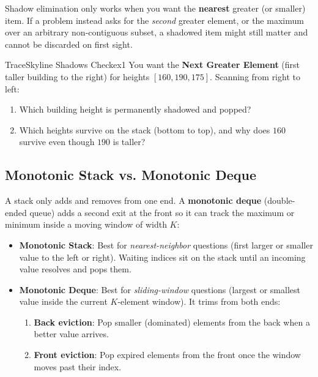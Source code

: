 \documentclass[11pt,a4paper]{article}
\theoremstyle{definition}
\begin{document}
\begin{watchoutbox}
Shadow elimination only works when you want the \textbf{nearest} greater (or smaller) item. If a problem instead asks for the \emph{second} greater element, or the maximum over an arbitrary non-contiguous subset, a shadowed item might still matter and cannot be discarded on first sight.
\end{watchoutbox}

\begin{tryitbox}{Trace}{Skyline Shadows Check}{ex1}
You want the \textbf{Next Greater Element} (first taller building to the right) for heights $[160, 190, 175]$. Scanning from right to left:
\begin{enumerate}
    \item Which building height is permanently shadowed and popped?
    \item Which heights survive on the stack (bottom to top), and why does $160$ survive even though $190$ is taller?
\end{enumerate}
\end{tryitbox}

\subsection{Monotonic Stack vs. Monotonic Deque}

A stack only adds and removes from one end. A \textbf{monotonic deque} (double-ended queue) adds a second exit at the front so it can track the maximum or minimum inside a moving window of width $K$:

\begin{itemize}
    \item \textbf{Monotonic Stack}: Best for \emph{nearest-neighbor} questions (first larger or smaller value to the left or right). Waiting indices sit on the stack until an incoming value resolves and pops them.
    \item \textbf{Monotonic Deque}: Best for \emph{sliding-window} questions (largest or smallest value inside the current $K$-element window). It trims from both ends:
    \begin{enumerate}
        \item \textbf{Back eviction}: Pop smaller (dominated) elements from the back when a better value arrives.
        \item \textbf{Front eviction}: Pop expired elements from the front once the window moves past their index.
    \end{enumerate}
\end{itemize}
\end{document}
